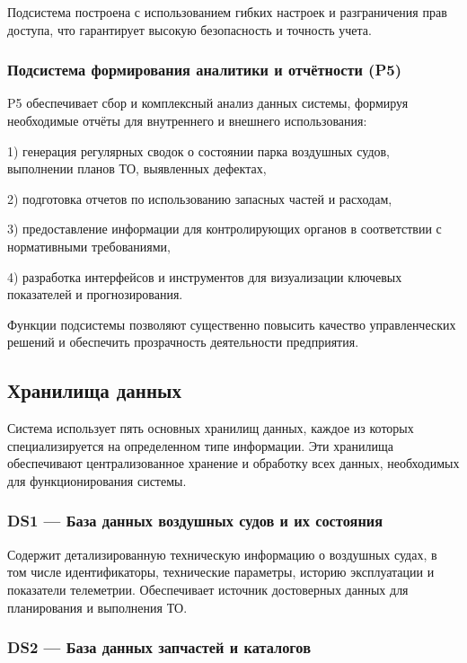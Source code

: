\documentclass[14pt,a4paper]{extarticle}
\begin{document}
Подсистема построена с использованием гибких настроек и разграничения прав доступа, что гарантирует высокую безопасность и точность учета.

\subsubsection{Подсистема формирования аналитики и отчётности (P5)}

P5 обеспечивает сбор и комплексный анализ данных системы, формируя необходимые отчёты для внутреннего и внешнего использования: 

1) генерация регулярных сводок о состоянии парка воздушных судов, выполнении планов ТО, выявленных дефектах,

2) подготовка отчетов по использованию запасных частей и расходам,

3) предоставление информации для контролирующих органов в соответствии с нормативными требованиями,

4) разработка интерфейсов и инструментов для визуализации ключевых показателей и прогнозирования.

Функции подсистемы позволяют существенно повысить качество управленческих решений и обеспечить прозрачность деятельности предприятия.

\subsection{Хранилища данных}

Система использует пять основных хранилищ данных, каждое из которых специализируется на определенном типе информации. Эти хранилища обеспечивают централизованное хранение и обработку всех данных, необходимых для функционирования системы.

\subsubsection{DS1 — База данных воздушных судов и их состояния}

Содержит детализированную техническую информацию о воздушных судах, в том числе идентификаторы, технические параметры, историю эксплуатации и показатели телеметрии. Обеспечивает источник достоверных данных для планирования и выполнения ТО.

\subsubsection{DS2 — База данных запчастей и каталогов}
\end{document}
